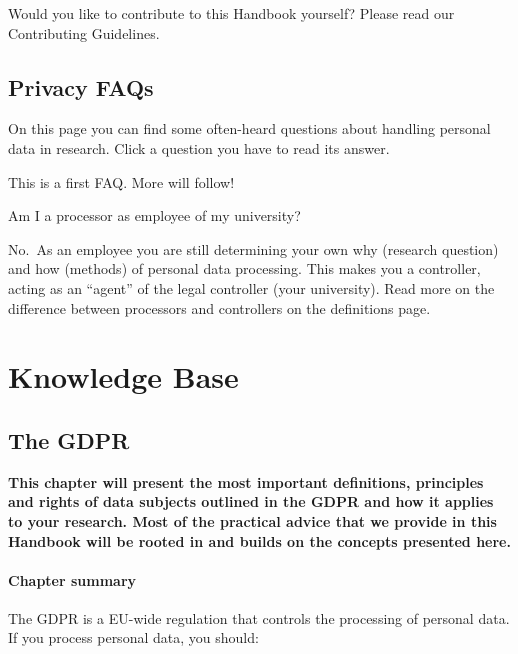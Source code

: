 \documentclass[
]{book}
\begin{document}
Would you like to contribute to this Handbook yourself? Please read our
Contributing Guidelines.

\hypertarget{faq}{%
\chapter{Privacy FAQs}\label{faq}}

On this page you can find some often-heard questions about handling personal
data in research. Click a question you have to read its answer.

This is a first FAQ. More will follow!

Am I a processor as employee of my university?

No.~As an employee you are still determining your own why (research question)
and how (methods) of personal data processing. This makes you a controller,
acting as an ``agent'' of the legal controller (your university). Read more on the
difference between processors and controllers on the
definitions page.

\hypertarget{part-knowledge-base}{%
\part*{Knowledge Base}\label{part-knowledge-base}}

\hypertarget{gdpr}{%
\chapter*{The GDPR}\label{gdpr}}

\textbf{This chapter will present the most important definitions, principles and rights
of data subjects outlined in the GDPR and how it applies to your research. Most
of the practical advice that we provide in this Handbook will be rooted in and
builds on the concepts presented here.}

\hypertarget{chapter-summary}{%
\subsection{Chapter summary}\label{chapter-summary}}

The GDPR is a EU-wide regulation that controls the processing of personal data.
If you process personal data, you should:
\end{document}
